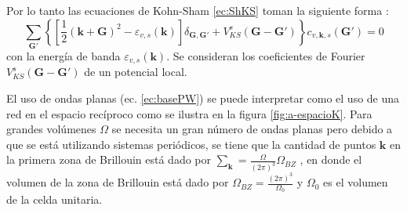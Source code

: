    Por lo tanto las ecuaciones de Kohn-Sham \ref{ec:ShKS} toman la siguiente forma \cite{doi:10.1080/00018738700101042}:
   \begin{equation}
   \sum_{\pmb{G'}} \left\{ \left[\frac{1}{2} (\pmb{k}+ \pmb{G})^2 - \varepsilon_{v,s} (\pmb{k}) \right] \delta_{\pmb{G},\pmb{G'}} + V_{KS} ^ s (\pmb{G}-\pmb{G'}) \right\} c_{v,\pmb{k},s} (\pmb{G'}) =0 \label{ec:HKSRes}
   \end{equation} 
   con la energ\'ia de banda $\varepsilon_{v,s} (\pmb{k})$. Se consideran los coeficientes de Fourier $V_{KS} ^ s (\pmb{G}-\pmb{G'})$ de un potencial local.
   \newline
   \par El uso de ondas planas (ec. \ref{ec:basePW}) se puede interpretar como el uso de una red en el espacio rec\'iproco como se ilustra en la figura \ref{fig:a-espacioK}. Para grandes vol\'umenes $\Omega$ se necesita un gran n\'umero de ondas planas pero debido  a que se est\'a utilizando sistemas peri\'odicos, se tiene que la cantidad de puntos $\pmb{k}$ en la primera zona de Brillouin est\'a dado por $\sum_{\pmb{k}} = \frac{\Omega}{(2 \pi )^3} \Omega_{BZ}$ \cite{MB-2015},  en donde el volumen de la zona de Brillouin est\'a dado por $\Omega_{BZ} =\frac{(2 \pi )^3}{\Omega_0} $ y $\Omega_0$ es el volumen de la celda unitaria.
   
